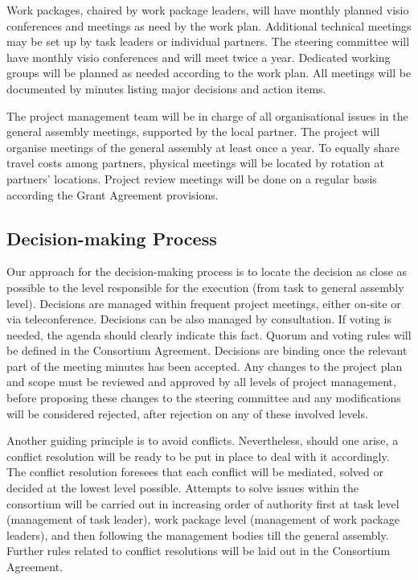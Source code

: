 Work packages, chaired by work package leaders, will have monthly
planned visio conferences and meetings as need by the work plan.
Additional technical meetings may be set up by task leaders or
individual partners. The steering committee will have monthly visio
conferences and will meet twice a year. Dedicated working groups will
be planned as needed according to the work plan.  All meetings will be
documented by minutes listing major decisions and action items.

The project management team will be in charge of all organisational
issues in the general assembly meetings, supported by the local
partner. The project will organise meetings of the general assembly at
least once a year. To equally share travel costs among partners,
physical meetings will be located by rotation at partners’
locations. Project review meetings will be done on a regular basis
according the Grant Agreement provisions.

\subsection*{Decision-making Process}

Our approach for the decision-making process is to locate the decision
as close as possible to the level responsible for the execution (from
task to general assembly level). Decisions are managed within
frequent project meetings, either on-site or via
teleconference. Decisions can be also managed by consultation. If
voting is needed, the agenda should clearly indicate this fact. Quorum
and voting rules will be defined in the Consortium
Agreement. Decisions are binding once the relevant part of the meeting
minutes has been accepted. Any changes to the project plan and scope
must be reviewed and approved by all levels of project management,
before proposing these changes to the steering committee and any
modifications will be considered rejected, after rejection on any of
these involved levels.

Another guiding principle is to avoid conflicts. Nevertheless, should
one arise, a conflict resolution will be ready to be put in place to
deal with it accordingly. The conflict resolution foresees that each
conflict will be mediated, solved or decided at the lowest level
possible. Attempts to solve issues within the consortium will be
carried out in increasing order of authority first at task level
(management of task leader), work package level (management of work
package leaders), and then following the management bodies till the
general assembly. Further rules related to conflict resolutions will
be laid out in the Consortium Agreement.

